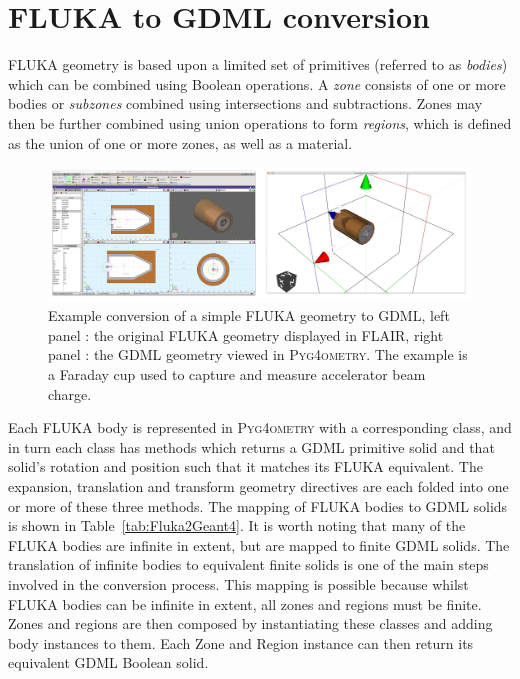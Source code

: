 \documentclass[final,5p,times,twocolumn]{elsarticle}
\newcommand{\PYGEOMETRY}{\textsc{Pyg4ometry}}
\begin{document}
\section{FLUKA to GDML conversion}
FLUKA geometry is based upon a limited set of primitives (referred to as
\textit{bodies}) which can be combined using Boolean operations. A
\textit{zone} consists of one or more bodies or \textit{subzones} combined
using intersections and subtractions.  Zones may then be further combined
using union operations to form \textit{regions}, which is defined as the
union of one or more zones, as well as a material.

\begin{figure}[htbp]
\begin{center}
\includegraphics[width=1.0\textwidth]{./model-scene/faradayCup2.pdf}
\caption{Example conversion of a simple FLUKA geometry to GDML, left panel :
the original FLUKA geometry displayed in FLAIR, right panel : the GDML geometry
viewed in \PYGEOMETRY{}. The example is a Faraday cup used to capture
and measure accelerator beam charge.}
\label{fig:fluka-to-geant4-cup}
\end{center}
\end{figure}

Each FLUKA body is represented in \PYGEOMETRY{} with a corresponding
class, and in turn each class has methods which returns a GDML
primitive solid and that solid's rotation and position such that it
matches its FLUKA equivalent.  The expansion, translation and
transform geometry directives are each folded into one or more of
these three methods.  The mapping of FLUKA bodies to GDML solids is
shown in Table~\ref{tab:Fluka2Geant4}.  It is worth noting that many
of the FLUKA bodies are infinite in extent, but are mapped to finite
GDML solids.  The translation of infinite bodies to equivalent finite
solids is one of the main steps involved in the conversion process.
This mapping is possible because whilst FLUKA bodies can be infinite
in extent, all zones and regions must be finite.  Zones and regions
are then composed by instantiating these classes and adding body
instances to them.  Each Zone and Region instance can then return its
equivalent GDML Boolean solid.
\end{document}

